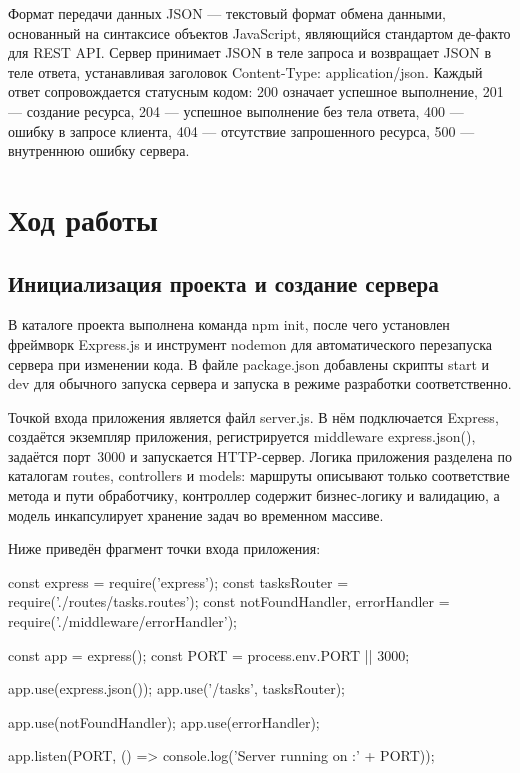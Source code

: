 \documentclass{stp}
\begin{document}
Формат передачи данных JSON — текстовый формат обмена данными,
основанный на синтаксисе объектов JavaScript, являющийся стандартом
де-факто для REST API. Сервер принимает JSON в теле запроса и
возвращает JSON в теле ответа, устанавливая заголовок
Content-Type: application/json. Каждый ответ сопровождается
статусным кодом: 200 означает успешное выполнение, 201 — создание
ресурса, 204 — успешное выполнение без тела ответа, 400 — ошибку в
запросе клиента, 404 — отсутствие запрошенного ресурса, 500 —
внутреннюю ошибку сервера.

\section{Ход работы}

\subsection{Инициализация проекта и создание сервера}

В каталоге проекта выполнена команда npm init, после чего
установлен фреймворк Express.js и инструмент nodemon для
автоматического перезапуска сервера при изменении кода. В файле
package.json добавлены скрипты start и dev
для обычного запуска сервера и запуска в режиме разработки
соответственно.

Точкой входа приложения является файл server.js. В нём
подключается Express, создаётся экземпляр приложения, регистрируется
middleware express.json(), задаётся порт~3000 и запускается
HTTP-сервер. Логика приложения разделена по каталогам
routes, controllers и models: маршруты
описывают только соответствие метода и пути обработчику, контроллер
содержит бизнес-логику и валидацию, а модель инкапсулирует хранение
задач во временном массиве.

Ниже приведён фрагмент точки входа приложения:

\begin{stplisting}
const express = require('express');
const tasksRouter = require('./routes/tasks.routes');
const { notFoundHandler, errorHandler }
  = require('./middleware/errorHandler');

const app = express();
const PORT = process.env.PORT || 3000;

app.use(express.json());
app.use('/tasks', tasksRouter);

app.use(notFoundHandler);
app.use(errorHandler);

app.listen(PORT, () =>
  console.log('Server running on :' + PORT));
\end{stplisting}
\end{document}
